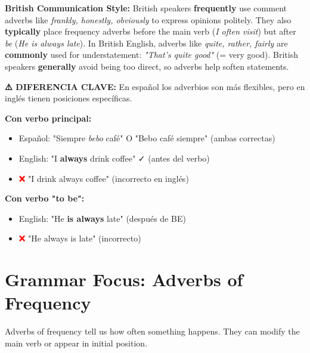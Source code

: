 \begin{britishbox}
\textbf{British Communication Style:} British speakers \textbf{frequently} use comment adverbs like \textit{frankly, honestly, obviously} to express opinions politely. They also \textbf{typically} place frequency adverbs before the main verb (\textit{I often visit}) but after \textit{be} (\textit{He is always late}). In British English, adverbs like \textit{quite, rather, fairly} are \textbf{commonly} used for understatement: \textit{"That's quite good"} (= very good). British speakers \textbf{generally} avoid being too direct, so adverbs help soften statements.
\end{britishbox}

\begin{comparisonbox}[title=🇪🇸 Posición de Adverbios: Español vs Inglés]
\textbf{⚠️ DIFERENCIA CLAVE:} En español los adverbios son más flexibles, pero en inglés tienen posiciones específicas.

\textbf{Con verbo principal:}
\begin{itemize}
    \item Español: "Siempre \textit{bebo} café" O "Bebo café siempre" (ambas correctas)
    \item English: "I \textbf{always} drink coffee" ✓ (antes del verbo)
    \item \textcolor{red}{❌} "I drink always coffee" (incorrecto en inglés)
\end{itemize}

\textbf{Con verbo "to be":}
\begin{itemize}
    \item English: "He \textbf{is always} late" (después de BE)
    \item \textcolor{red}{❌} "He always is late" (incorrecto)
\end{itemize}
\end{comparisonbox}

\section{Grammar Focus: Adverbs of Frequency}

Adverbs of frequency tell us how often something happens. They can modify the main verb or appear in initial position.

